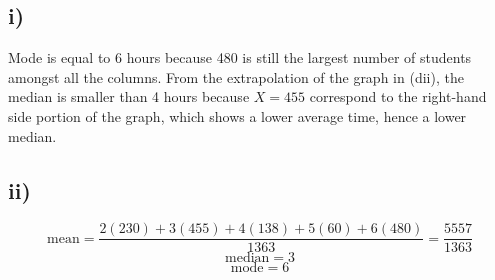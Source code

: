 \documentclass[a4paper]{article}
\begin{document}
\subsection*{i)}
Mode is equal to 6 hours because 480 is still the largest number of students amongst all the columns. From the extrapolation of the graph in (dii), the median is smaller than 4 hours because
\(X=455\) correspond to the right-hand side portion of the graph, which shows a lower
average time, hence a lower median.
\subsection*{ii)}
\[\text{mean}=\frac{2(230)+3(455)+4(138)+5(60)+6(480)}{1363}=\boxed{\frac{5557}{1363}}\]
\[\text{median}=\boxed3\]
\[\text{mode}=\boxed6\]
\end{document}
